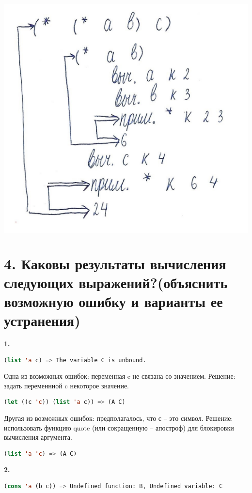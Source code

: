 \documentclass[12pt]{report}
\begin{document}
\includegraphics[scale=1]{img/3}

\section*{4. Каковы результаты вычисления следующих выражений?(объяснить возможную ошибку и варианты ее устранения)}

\textbf{1.}
 
\begin{lstlisting}[language=Lisp]
(list 'a c) => The variable C is unbound.
\end{lstlisting}

Одна из возможных ошибок: переменная c не связана со значением. Решение: задать переменнной c некоторое значение.
\begin{lstlisting}[language=Lisp]
(let ((c 'c)) (list 'a c)) => (A C)
\end{lstlisting}

Другая из возможных ошибок: предполагалось, что с -- это символ. Решение: использовать функцию quote (или сокращенную -- апостроф) для блокировки вычисления аргумента.
\begin{lstlisting}[language=Lisp]
	(list 'a 'c) => (A C)
\end{lstlisting}





\textbf{2.}
\begin{lstlisting}[language=Lisp]
	 (cons 'a (b c)) => Undefined function: B, Undefined variable: C
\end{lstlisting}
\end{document}
